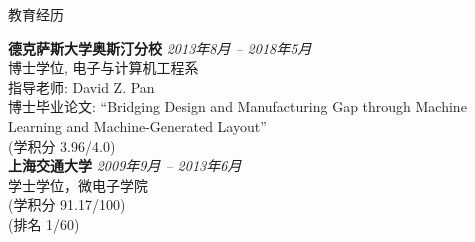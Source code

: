 

\begin{rSection}{教育经历}


{\bf 德克萨斯大学奥斯汀分校} \hfill {\em 2013年8月 -- 2018年5月} \\ 
博士学位, 电子与计算机工程系 \\
指导老师: David Z. Pan \\
博士毕业论文: ``Bridging Design and Manufacturing Gap through Machine Learning and Machine-Generated Layout'' \\
(学积分 3.96/4.0) \\

{\bf 上海交通大学} \hfill {\em 2009年9月 -- 2013年6月} \\ 
学士学位，微电子学院 \\
(学积分 91.17/100) \\
(排名 1/60)

\end{rSection}

